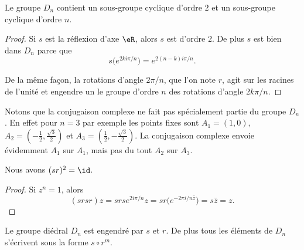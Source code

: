 \begin{proposition}
    Le groupe \( D_n\) contient un sous-groupe cyclique d'ordre \( 2\) et un sous-groupe cyclique d'ordre \( n\).
\end{proposition}

\begin{proof}
    Si \( s\) est la réflexion d'axe \( \eR\), alors \( s\) est d'ordre \( 2\). De plus \( s\) est bien dans \( D_n\) parce que
    \begin{equation}    \label{EqSUshknP}
        s\big(  e^{2ki\pi/n} \big)= e^{2(n-k)i\pi/n}.
    \end{equation}

    De la même façon, la rotations d'angle \(2\pi/n\), que l'on note \( r\), agit sur les racines de l'unité et engendre un le groupe d'ordre \( n\) des rotations d'angle \(2 k\pi/n\).
\end{proof}

Notons que la conjugaison complexe ne fait pas spécialement partie du groupe \( D_n\). En effet pour \( n=3\) par exemple les points fixes sont \( A_1=(1,0)\), \( A_2=(-\frac{ 1 }{2},\frac{ \sqrt{3} }{2})\) et \( A_3=(\frac{ 1 }{2},-\frac{ \sqrt{3} }{2})\). La conjugaison complexe envoie évidemment \( A_1\) sur \( A_1\), mais pas du tout \( A_2\) sur \( A_3\).

\begin{proposition}
    Nous avons \( (sr)^2=\id\).
\end{proposition}

\begin{proof}
    Si \( z^n=1\), alors
    \begin{equation}
        (srsr)z=srs e^{2 i\pi/n}z=sr\big( e^{-2\pi i/n\bar z}\big)=s\bar z=z.
    \end{equation}
\end{proof}

\begin{proposition} \label{PropLDIPoZ}
    Le groupe diédral \( D_n\) est engendré par \( s\) et \( r\). De plus tous les éléments de \( D_n\) s'écrivent sous la forme \( s\circ r^m\).
\end{proposition}

